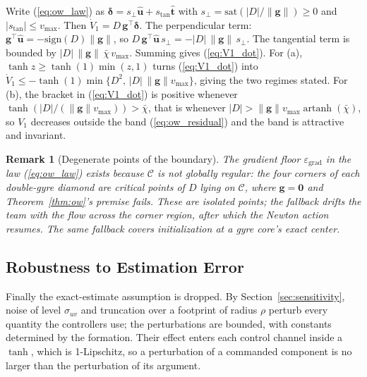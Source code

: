 \documentclass[lettersize,journal]{IEEEtran}
\newtheorem{remark}{Remark}
\begin{document}
\begin{IEEEproof}
Write (\ref{eq:ow_law}) as $\boldsymbol{\delta} = s_\perp
\hat{\mathbf{u}} + s_{\text{tan}} \hat{\mathbf{t}}$ with $s_\perp =
\mathrm{sat}(|D|/\|\mathbf{g}\|) \geq 0$ and $|s_{\text{tan}}| \leq
v_{\max}$. Then $\dot{V}_1 = D\,\mathbf{g}^\top \boldsymbol{\delta}$.
The perpendicular term: $\mathbf{g}^\top \hat{\mathbf{u}} =
-\mathrm{sign}(D)\|\mathbf{g}\|$, so $D\,\mathbf{g}^\top
\hat{\mathbf{u}}\, s_\perp = -|D|\,\|\mathbf{g}\|\, s_\perp$. The
tangential term is bounded by $|D|\,\|\mathbf{g}\|\,\bar{\chi}\,
v_{\max}$. Summing gives (\ref{eq:V1_dot}). For (a), $\tanh z \geq
\tanh(1)\min(z, 1)$ turns (\ref{eq:V1_dot}) into $\dot{V}_1 \leq
-\tanh(1)\min\{D^2,\, |D|\,\|\mathbf{g}\|v_{\max}\}$, giving the two
regimes stated. For (b), the bracket in (\ref{eq:V1_dot}) is positive
whenever $\tanh(|D|/(\|\mathbf{g}\|v_{\max})) > \bar{\chi}$, that is
whenever $|D| > \|\mathbf{g}\|v_{\max}\operatorname{artanh}
(\bar{\chi})$, so $V_1$ decreases outside the band
(\ref{eq:ow_residual}) and the band is attractive and invariant.
\end{IEEEproof}

\begin{remark}[Degenerate points of the boundary]
The gradient floor $\varepsilon_{\text{grad}}$ in the law
(\ref{eq:ow_law}) exists because $\mathcal{C}$ is not globally regular:
the four corners of each double-gyre diamond are critical points of $D$
lying on $\mathcal{C}$, where $\mathbf{g} = \mathbf{0}$ and
Theorem~\ref{thm:ow}'s premise fails. These are isolated points; the
fallback drifts the team with the flow across the corner region, after
which the Newton action resumes. The same fallback covers
initialization at a gyre core's exact center.
\end{remark}

\subsection{Robustness to Estimation Error}
\label{sec:stab_iss}

Finally the exact-estimate assumption is dropped. By
Section~\ref{sec:sensitivity}, noise of level $\sigma_{uv}$ and
truncation over a footprint of radius $\rho$ perturb every quantity the
controllers use; the perturbations are bounded, with constants
determined by the formation. Their effect enters each control channel
inside a $\tanh$, which is 1-Lipschitz, so a perturbation of a
commanded component is no larger than the perturbation of its argument.
\end{document}
